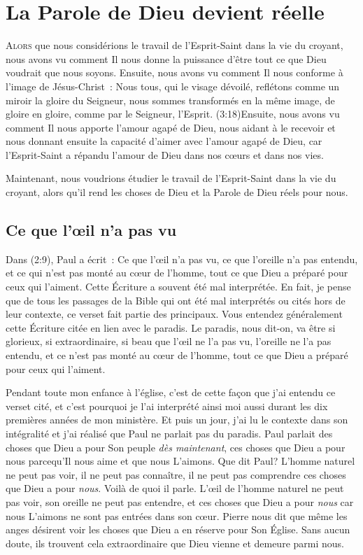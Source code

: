 \chapter{La Parole de Dieu devient r\'eelle}

\lettrine{A}{lors} que nous considérions
 le travail de l'Esprit-Saint
 dans la vie du croyant, nous avons vu comment Il nous donne la puissance
 d'être tout ce que Dieu voudrait que nous soyons.
 Ensuite, nous avons vu comment Il nous conforme à l'image de Jésus-Christ~:
 \og Nous tous, qui le visage dévoilé, reflétons comme un miroir la gloire
 du Seigneur, nous sommes transformés en la même image, de gloire en gloire,
 comme par le Seigneur, l'Esprit. \fg{}
 (3:18)Ensuite, nous avons vu comment
 Il nous apporte l'amour agapé de Dieu,
 nous aidant à le recevoir et nous donnant ensuite la capacité d'aimer
 avec l'amour agapé de Dieu, car l'Esprit-Saint a répandu l'amour de Dieu
 dans nos cœurs et dans nos vies.

Maintenant, nous voudrions étudier le travail de l'Esprit-Saint dans la vie
 du croyant, alors qu'il rend les choses de Dieu et la Parole de Dieu
 réels pour nous.


\section*{Ce que l'œil n'a pas vu}

Dans (2:9), Paul a écrit~:
 \og Ce que l'œil n'a pas vu, ce que l'oreille n'a pas entendu,
 et ce qui n'est pas monté au cœur de l'homme, tout ce que Dieu
 a préparé pour ceux qui l'aiment. \fg{}
 Cette Écriture a souvent été mal interprétée. En fait,
 je pense que de tous les passages de la Bible qui ont été mal interprétés
 ou cités hors de leur contexte, ce verset fait partie des principaux.
 Vous entendez généralement cette Écriture citée en lien avec le paradis.
 Le paradis, nous dit-on, va être si glorieux, si extraordinaire,
 si beau que \og l'œil ne l'a pas vu, l'oreille ne l'a pas entendu,
 et ce n'est pas monté au cœur de l'homme, tout ce que Dieu a préparé
 pour ceux qui l'aiment. \fg{}

Pendant toute mon enfance à l'église, c'est de cette façon que j'ai entendu
 ce verset cité, et c'est pourquoi je l'ai interprété ainsi moi aussi
 durant les dix premières années de mon ministère.
 Et puis un jour, j'ai lu le contexte dans son intégralité et j'ai réalisé
 que Paul ne parlait pas du paradis. Paul parlait des choses que Dieu
 a pour Son peuple \emph{dès maintenant},
 ces choses que Dieu a pour nous parcequ'Il
 nous aime et que nous L'aimons. Que dit Paul?
 L'homme naturel ne peut pas voir, il ne peut pas connaître,
 il ne peut pas comprendre ces choses que Dieu a pour \emph{nous}.
 Voilà de quoi il parle. L'œil de l'homme naturel ne peut pas voir,
 son oreille ne peut pas entendre, et ces choses que Dieu a pour \emph{nous}
 car nous L'aimons ne sont pas entrées dans son cœur.
 Pierre nous dit que même les anges désirent voir les choses que Dieu
 a en réserve pour Son Église.
 Sans aucun doute, ils trouvent cela extraordinaire que Dieu vienne
 et demeure parmi nous.

